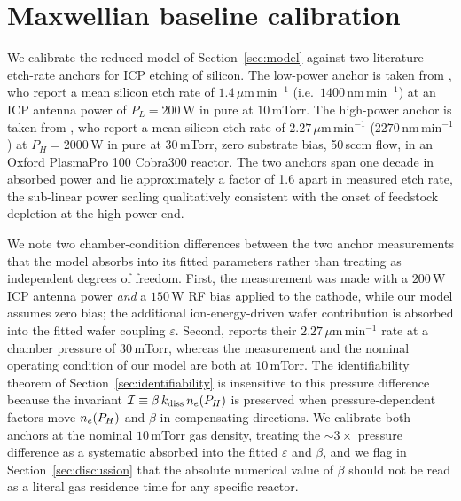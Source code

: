 \section{Maxwellian baseline calibration}
\label{sec:baseline}

We calibrate the reduced model of Section~\ref{sec:model} against
two literature etch-rate anchors for \sfsix{} ICP etching of
silicon. The low-power anchor is taken from \citet{mansano1999}, who
report a mean silicon etch rate of
$1.4\,\mu\mathrm{m\,min^{-1}}$ (i.e.\ $1400\,$nm\,min$^{-1}$) at an
ICP antenna power of $P_L = 200$\,W in pure \sfsix{} at
$10\,$mTorr. The high-power anchor is taken from
\citet{panduranga2019}, who report a mean silicon etch rate of
$2.27\,\mu\mathrm{m\,min^{-1}}$ ($2270\,$nm\,min$^{-1}$) at
$P_H = 2000\,$W in pure \sfsix{} at $30\,$mTorr, zero substrate
bias, 50\,sccm flow, in an Oxford PlasmaPro 100 Cobra300 reactor.
The two anchors span one decade in absorbed power and lie
approximately a factor of 1.6 apart in measured etch rate, the
sub-linear power scaling qualitatively consistent with the onset of
feedstock depletion at the high-power end.

We note two chamber-condition differences between the two anchor
measurements that the model absorbs into its fitted parameters
rather than treating as independent degrees of freedom. First, the
\citet{mansano1999} measurement was made with a $200$\,W ICP
antenna power \emph{and} a $150$\,W RF bias applied to the
cathode, while our model assumes zero bias; the additional
ion-energy-driven wafer contribution is absorbed into the fitted
wafer coupling $\varepsilon$. Second, \citet{panduranga2019}
reports their $2.27\,\mu\mathrm{m\,min^{-1}}$ rate at a chamber
pressure of $30\,$mTorr, whereas the \citet{mansano1999}
measurement and the nominal operating condition of our model are
both at $10\,$mTorr. The identifiability theorem of
Section~\ref{sec:identifiability} is insensitive to this pressure
difference because the invariant
$\mathcal{I} \equiv \beta\,k_{\mathrm{diss}}\,n_e(P_H)$ is preserved when
pressure-dependent factors move $n_e(P_H)$ and $\beta$ in
compensating directions. We calibrate both anchors at the nominal
$10\,$mTorr gas density, treating the $\sim\!3\times$ pressure
difference as a systematic absorbed into the fitted $\varepsilon$
and $\beta$, and we flag in Section~\ref{sec:discussion} that the
absolute numerical value of $\beta$ should not be read as a literal
gas residence time for any specific reactor.


